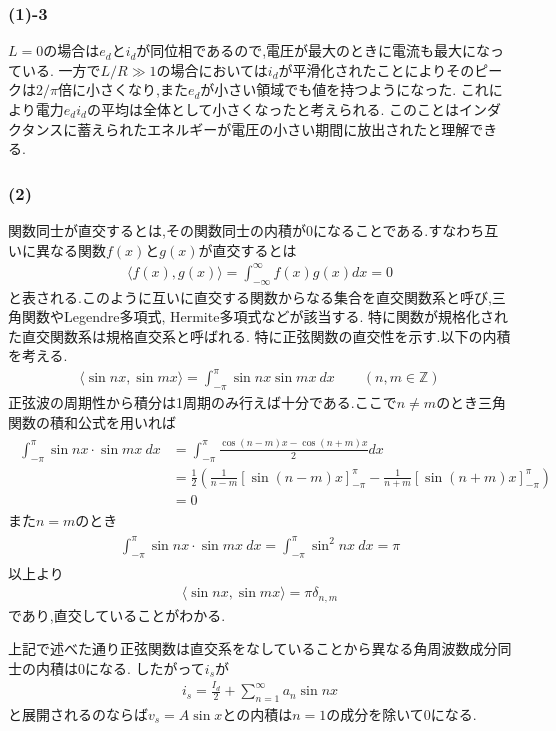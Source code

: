 \documentclass[uplatex,a4j,11pt,dvipdfmx]{jsarticle}
\begin{document}
\subsubsection*{(1)-3}
$L=0$の場合は$e_d$と$i_d$が同位相であるので,電圧が最大のときに電流も最大になっている.
一方で$L/R\gg 1$の場合においては$i_d$が平滑化されたことによりそのピークは$2/\pi$倍に小さくなり,また$e_d$が小さい領域でも値を持つようになった.
これにより電力$e_di_d$の平均は全体として小さくなったと考えられる.
このことはインダクタンスに蓄えられたエネルギーが電圧の小さい期間に放出されたと理解できる.
\subsubsection*{(2)}
関数同士が直交するとは,その関数同士の内積が0になることである.すなわち互いに異なる関数$f(x)$と$g(x)$が直交するとは
\begin{align}
  \langle f(x), g(x)\rangle=\int_{-\infty}^\infty f(x)g(x)dx=0
\end{align}
と表される.このように互いに直交する関数からなる集合を直交関数系と呼び,三角関数やLegendre多項式, Hermite多項式などが該当する.
特に関数が規格化された直交関数系は規格直交系と呼ばれる.
特に正弦関数の直交性を示す.以下の内積を考える.
\begin{align}
  \langle \sin nx,\sin mx\rangle=\int_{-\pi}^{\pi}\sin nx\sin mx\ dx\qquad (n,m\in\mathbb{Z})
\end{align}
正弦波の周期性から積分は1周期のみ行えば十分である.ここで$n\neq m$のとき三角関数の積和公式を用いれば
\begin{align}
  \begin{split}
    \int_{-\pi}^{\pi}\sin nx\cdot\sin mx\ dx&=\int_{-\pi}^{\pi}\frac{\cos(n-m)x-\cos(n+m)x}{2}dx\\
    &=\frac{1}{2}\left(\frac{1}{n-m}\left[\sin(n-m)x\right]_{-\pi}^{\pi}-\frac{1}{n+m}\left[\sin(n+m)x\right]_{-\pi}^{\pi}\right)\\
    &=0
  \end{split}
\end{align}
また$n=m$のとき
\begin{align}
  \begin{split}
    \int_{-\pi}^{\pi}\sin nx\cdot\sin mx\ dx=\int_{-\pi}^\pi\sin^2 nx\ dx=\pi
  \end{split}
\end{align}
以上より
\begin{align}
  \langle \sin nx,\sin mx\rangle=\pi\delta_{n,m}
\end{align}
であり,直交していることがわかる.

上記で述べた通り正弦関数は直交系をなしていることから異なる角周波数成分同士の内積は$0$になる.
したがって$i_s$が
\begin{align}
  i_s=\frac{I_d}{2}+\sum_{n=1}^\infty a_n\sin nx
\end{align}
と展開されるのならば$v_s=A\sin x$との内積は$n=1$の成分を除いて$0$になる.
\end{document}
